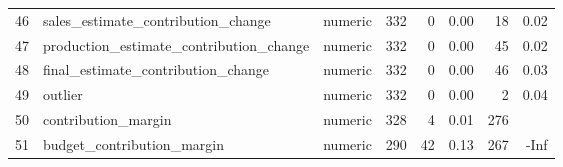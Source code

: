 \begin{sidewaystable}[ht]
\begin{tabular}{rllrrrrr}
  46 & sales\_estimate\_contribution\_change & numeric & 332 &   0 & 0.00 &  18 & 0.02 \\ 
  47 & production\_estimate\_contribution\_change & numeric & 332 &   0 & 0.00 &  45 & 0.02 \\ 
  48 & final\_estimate\_contribution\_change & numeric & 332 &   0 & 0.00 &  46 & 0.03 \\ 
  49 & outlier & numeric & 332 &   0 & 0.00 &   2 & 0.04 \\ 
  50 & contribution\_margin & numeric & 328 &   4 & 0.01 & 276 &  \\ 
  51 & budget\_contribution\_margin & numeric & 290 &  42 & 0.13 & 267 & -Inf \\ 
   \hline
\end{tabular}
\end{sidewaystable}
